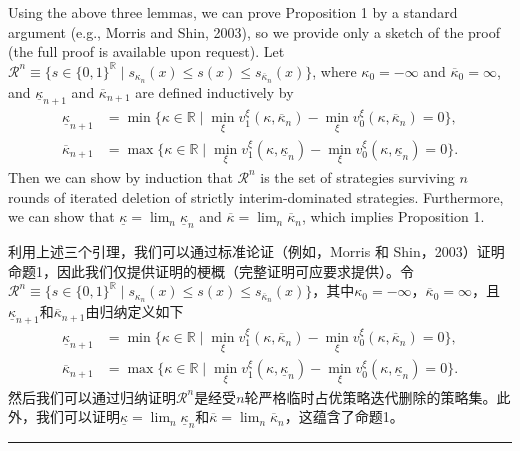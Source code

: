 \documentclass[12pt,a4paper]{article}
\newenvironment{original}
  {\par\medskip\noindent\color{black}\ignorespaces}
  {\par\medskip}
\newenvironment{translation}
  {\par\noindent\color{darkblue}\ignorespaces}
  {\par\medskip\noindent\hrule\par\medskip}
\theoremstyle{definition}
\theoremstyle{remark}
\begin{document}
\medskip
\begin{original}
Using the above three lemmas, we can prove Proposition 1 by a standard argument (e.g., Morris and Shin, 2003), so we provide only a sketch of the proof (the full proof is available upon request). Let $\mathcal{R}^n \equiv \{s \in \{0,1\}^{\mathbb{R}} \mid s_{\kappa_n}(x) \le s(x) \le s_{\overline{\kappa}_n}(x)\}$, where $\kappa_0 = -\infty$ and $\overline{\kappa}_0 = \infty$, and $\underline{\kappa}_{n+1}$ and $\overline{\kappa}_{n+1}$ are defined inductively by
\begin{align*}
\underline{\kappa}_{n+1} &= \min\{\kappa \in \mathbb{R} \mid \min_{\xi} v_1^\xi(\kappa, \overline{\kappa}_n) - \min_{\xi} v_0^\xi(\kappa, \overline{\kappa}_n) = 0\},\\
\overline{\kappa}_{n+1} &= \max\{\kappa \in \mathbb{R} \mid \min_{\xi} v_1^\xi(\kappa, \underline{\kappa}_n) - \min_{\xi} v_0^\xi(\kappa, \underline{\kappa}_n) = 0\}.
\end{align*}
Then we can show by induction that $\mathcal{R}^n$ is the set of strategies surviving $n$ rounds of iterated deletion of strictly interim-dominated strategies. Furthermore, we can show that $\underline{\kappa} = \lim_{n} \underline{\kappa}_n$ and $\overline{\kappa} = \lim_{n} \overline{\kappa}_n$, which implies Proposition 1.
\end{original}
\begin{translation}
利用上述三个引理，我们可以通过标准论证（例如，Morris 和 Shin，2003）证明命题1，因此我们仅提供证明的梗概（完整证明可应要求提供）。令$\mathcal{R}^n \equiv \{s \in \{0,1\}^{\mathbb{R}} \mid s_{\kappa_n}(x) \le s(x) \le s_{\overline{\kappa}_n}(x)\}$，其中$\kappa_0 = -\infty$，$\overline{\kappa}_0 = \infty$，且$\underline{\kappa}_{n+1}$和$\overline{\kappa}_{n+1}$由归纳定义如下
\begin{align*}
\underline{\kappa}_{n+1} &= \min\{\kappa \in \mathbb{R} \mid \min_{\xi} v_1^\xi(\kappa, \overline{\kappa}_n) - \min_{\xi} v_0^\xi(\kappa, \overline{\kappa}_n) = 0\},\\
\overline{\kappa}_{n+1} &= \max\{\kappa \in \mathbb{R} \mid \min_{\xi} v_1^\xi(\kappa, \underline{\kappa}_n) - \min_{\xi} v_0^\xi(\kappa, \underline{\kappa}_n) = 0\}.
\end{align*}
然后我们可以通过归纳证明$\mathcal{R}^n$是经受$n$轮严格临时占优策略迭代删除的策略集。此外，我们可以证明$\underline{\kappa} = \lim_{n} \underline{\kappa}_n$和$\overline{\kappa} = \lim_{n} \overline{\kappa}_n$，这蕴含了命题1。
\end{translation}
\end{document}
